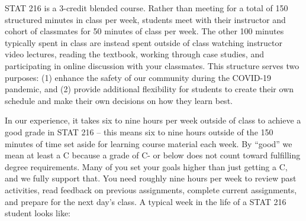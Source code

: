 \documentclass[
]{report}
\begin{document}
STAT 216 is a 3-credit blended course. Rather than meeting for a total of 150 structured minutes in class per week, students meet with their instructor and cohort of classmates for 50 minutes of class per week. The other 100 minutes typically spent in class are instead spent outside of class watching instructor video lectures, reading the textbook, working through case studies, and participating in online discussion with your classmates. This structure serves two purposes: (1) enhance the safety of our community during the COVID-19 pandemic, and (2) provide additional flexibility for students to create their own schedule and make their own decisions on how they learn best.

In our experience, it takes six to nine hours per week outside of class to achieve a good grade in STAT 216 -- this means six to nine hours outside of the 150 minutes of time set aside for learning course material each week. By ``good'' we mean at least a C because a grade of C- or below does not count toward fulfilling degree requirements. Many of you set your goals higher than just getting a C, and we fully support that. You
need roughly nine hours per week to review past activities, read feedback on previous assignments, complete current assignments, and prepare for the next day's class. A typical week in the life of a STAT 216 student looks like:
\end{document}
